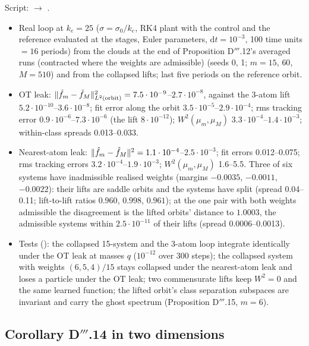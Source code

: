 Script:  $\to$ .
\begin{itemize}
  \item Real loop at $k_e=25$ ($\sigma=\sigma_0/k_e$, RK4 plant with the control and the reference evaluated at the
    stages, Euler parameters, $\mathrm{d}t=10^{-3}$, 100 time units ${}=16$ periods) from the clouds at the end of
    Proposition D$'''$.12's averaged runs (contracted where the weights are admissible) (seeds 0, 1; $m=15$, $60$,
    $M=510$) and from the collapsed lifts; last five periods on the reference orbit.
  \item OT leak: $\lVert \hat f_m-\hat f_M\rVert^2_{L^2(\mathrm{orbit})}=7.5\cdot10^{-9}$--$2.7\cdot10^{-8}$, against the
    3-atom lift $5.2\cdot10^{-10}$--$3.6\cdot10^{-8}$; fit error along the orbit
    $3.5\cdot10^{-5}$--$2.9\cdot10^{-4}$; rms tracking error $0.9\cdot10^{-6}$--$7.3\cdot10^{-6}$ (the lift
    $8\cdot10^{-12}$); $W^2(\mu_m,\mu_M)$ $3.3\cdot10^{-4}$--$1.4\cdot10^{-3}$; within-class spreads 0.013--0.033.
  \item Nearest-atom leak: $\lVert \hat f_m-\hat f_M\rVert^2=1.1\cdot10^{-4}$--$2.5\cdot10^{-3}$; fit errors 0.012--0.075;
    rms tracking errors $3.2\cdot10^{-4}$--$1.9\cdot10^{-3}$; $W^2(\mu_m,\mu_M)$ 1.6--5.5. Three of six systems have
    inadmissible realised weights (margins $-0.0035$, $-0.0011$, $-0.0022$): their lifts are saddle orbits and the
    systems have split (spread 0.04--0.11; lift-to-lift ratios $0.960$, $0.998$, $0.961$); at the one pair with both
    weights admissible the disagreement is the lifted orbits' distance to $1.0003$, the admissible systems within
    $2.5\cdot10^{-11}$ of their lifts (spread 0.0006--0.0013).
  \item Tests (): the collapsed 15-system and the 3-atom loop integrate identically under
    the OT leak at masses $q$ ($10^{-12}$ over 300 steps); the collapsed system with weights $(6,5,4)/15$ stays
    collapsed under the nearest-atom leak and loses a particle under the OT leak; two commensurate lifts keep
    $W^2=0$ and the same learned function; the lifted orbit's class separation subspaces are invariant and carry the
    ghost spectrum (Proposition D$'''$.15, $m=6$).
\end{itemize}

\subsection{Corollary D\texorpdfstring{$'''$}{'''}.14 in two dimensions}

